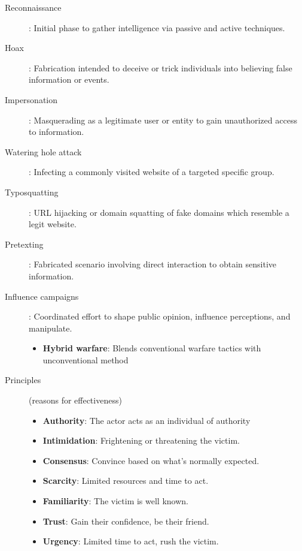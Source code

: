 \begin{fullwidth}
\begin{description}
        \item[Reconnaissance]: Initial phase to gather intelligence via passive and active techniques.
        \item[Hoax]: Fabrication intended to deceive or trick individuals into believing false information or events.
        \item[Impersonation]: Masquerading as a legitimate user or entity to gain unauthorized access to information.
        \item[Watering hole attack]: Infecting a commonly visited website of a targeted specific group.
        \item[Typosquatting]: URL hijacking or domain squatting of fake domains which resemble a legit website.
        \item[Pretexting]: Fabricated scenario involving direct interaction to obtain sensitive information.
        \item[Influence campaigns]: Coordinated effort to shape public opinion, influence perceptions, and manipulate.
        \begin{itemize}\itemsep2pt
            \item[]\textbf{Hybrid warfare}: Blends conventional warfare tactics with unconventional method
        \end{itemize}
        \item[Principles] (reasons for effectiveness)
        \begin{itemize}\itemsep2pt
            \item \textbf{Authority}: The actor acts as an individual of authority
            \item \textbf{Intimidation}: Frightening or threatening the victim.
            \item \textbf{Consensus}: Convince based on what’s normally expected.
            \item \textbf{Scarcity}: Limited resources and time to act.
            \item \textbf{Familiarity}: The victim is well known.
            \item \textbf{Trust}: Gain their confidence, be their friend.
            \item \textbf{Urgency}: Limited time to act, rush the victim.
        \end{itemize}
    \end{description}
\end{fullwidth}
